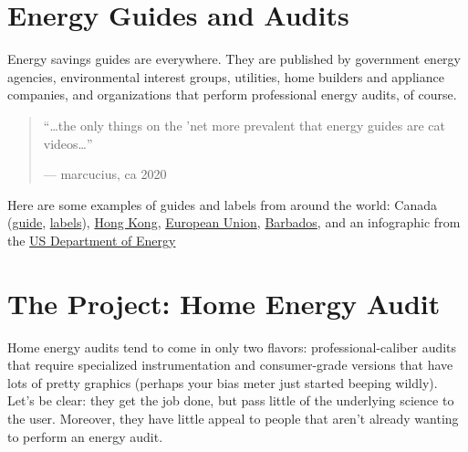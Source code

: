 \documentclass[
]{book}
\begin{document}
\hypertarget{energy-guides-and-audits}{%
\section{Energy Guides and Audits}\label{energy-guides-and-audits}}

Energy savings guides are everywhere. They are published by government energy agencies, environmental interest groups, utilities, home builders and appliance companies, and organizations that perform professional energy audits, of course.

\begin{quote}
``\ldots the only things on the 'net more prevalent
that energy guides are cat videos\ldots{}''

\hfill --- marcucius, ca 2020
\end{quote}

Here are some examples of guides and labels from around the world: Canada (\href{https://www.nrcan.gc.ca/energy-efficiency/energy-efficiency-homes/make-your-home-more-energy-efficient/20550}{guide}, \href{https://www.nrcan.gc.ca/energy-efficiency/energy-efficiency-products/product-information/windows-doors-skylights/sample-labels-windows-doors-and-skylights/13958}{labels}),
\href{https://www.clp.com.hk/en/my-home-site/energy-saving-ideas-site/understanding-energy-labels-site/PublishingImages/logo_EnergyLabel_detail.jpg}{Hong Kong}, \href{https://ec.europa.eu/info/energy-climate-change-environment/standards-tools-and-labels/products-labelling-rules-and-requirements/energy-label-and-ecodesign/about_en}{European Union}, \href{figures/barbadoslabel.png}{Barbados}, and an infographic from the \href{https://www.energy.gov/sites/prod/files/styles/borealis_article_hero_respondxl2/public/energysaver2017_HomeEnergyAudits.png?itok=JTSoNyts}{US Department of Energy}

\hypertarget{the-project-home-energy-audit}{%
\section{The Project: Home Energy Audit}\label{the-project-home-energy-audit}}

Home energy audits tend to come in only two flavors: professional-caliber audits that require specialized instrumentation and consumer-grade versions that have lots of pretty graphics (perhaps your bias meter just started beeping wildly). Let's be clear: they get the job done, but pass little of the underlying science to the user. Moreover, they have little appeal to people that aren't already wanting to perform an energy audit.
\end{document}
